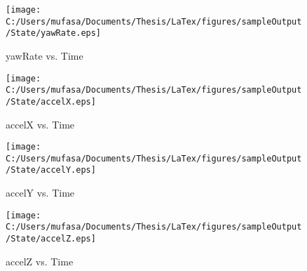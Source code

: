\begin{figure}[]
	\centering
	\caption{yawRate vs. Time}
		\texttt{[image: C:/Users/mufasa/Documents/Thesis/LaTex/figures/sampleOutput/State/yawRate.eps]}
\end{figure}
\begin{figure}[]
	\centering
	\caption{accelX vs. Time}
		\texttt{[image: C:/Users/mufasa/Documents/Thesis/LaTex/figures/sampleOutput/State/accelX.eps]}
\end{figure}
\begin{figure}[]
	\centering
	\caption{accelY vs. Time}
		\texttt{[image: C:/Users/mufasa/Documents/Thesis/LaTex/figures/sampleOutput/State/accelY.eps]}
\end{figure}
\begin{figure}[]
	\centering
	\caption{accelZ vs. Time}
		\texttt{[image: C:/Users/mufasa/Documents/Thesis/LaTex/figures/sampleOutput/State/accelZ.eps]}
\end{figure}

